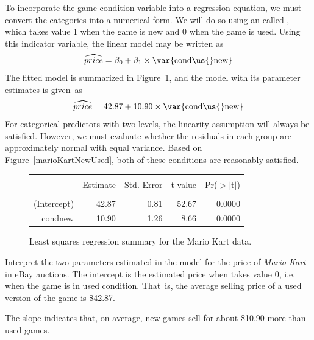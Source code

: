 To incorporate the game condition variable into a regression equation, we must convert the categories into a numerical form. We will do so using an  called , which takes value 1 when the game is new and 0 when the game is used. Using this indicator variable, the linear model may be written as
\begin{align*}
\widehat{price} = \beta_0 + \beta_1 \times \text{\var{cond\us{}new}}
\end{align*}
The fitted model is summarized in Figure~\ref{marioKartNewUsedRegrSummary}, and the model with its parameter estimates is given~as
\begin{align*}
\widehat{price} = 42.87 + 10.90 \times \text{\var{cond\us{}new}}
\end{align*}
For categorical predictors with two levels, the linearity assumption will always be satisfied.
However, we must evaluate whether the residuals in each group are approximately normal with equal variance.
Based on Figure~\ref{marioKartNewUsed}, both of these conditions are reasonably satisfied.

\begin{figure}[h]
\centering
\begin{tabular}{rrrrr}
  \hline
  \vspace{-3.7mm} & & & & \\
 & Estimate & Std. Error & t value & Pr($>$$|$t$|$) \\ 
  \hline
  \vspace{-3.6mm} & & & & \\
(Intercept) & 42.87 & 0.81 & 52.67 & 0.0000 \\ 
  cond\us{}new & 10.90 & 1.26 & 8.66 & 0.0000 \\ 
   \hline
\end{tabular}
\caption{Least squares regression summary for the Mario Kart data.}
\label{marioKartNewUsedRegrSummary}
\end{figure}

\begin{examplewrap}
\begin{nexample}{Interpret the two parameters estimated in the model for the price of \emph{Mario Kart} in eBay auctions.}
The intercept is the estimated price when  takes value 0, i.e. when the game is in used condition. That~is, the average selling price of a used version of the game is \$42.87.

The slope indicates that, on average, new games sell for about \$10.90 more than used games.
\end{nexample}
\end{examplewrap}

